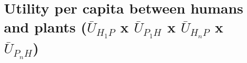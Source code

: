 \documentclass[
]{book}
\begin{document}
\newpage

\hypertarget{utility-per-capita-between-humans-and-plants-baru_h_1p-x-baru_p_1h-x-baru_h_np-x-baru_p_nh}{%
\section{\texorpdfstring{Utility per capita between humans and plants (\(\bar{U}_{H_{1}P}\) x \(\bar{U}_{P_{1}H}\) x \(\bar{U}_{H_{n}P}\) x \(\bar{U}_{P_{n}H}\))}{Utility per capita between humans and plants (\textbackslash bar\{U\}\_\{H\_\{1\}P\} x \textbackslash bar\{U\}\_\{P\_\{1\}H\} x \textbackslash bar\{U\}\_\{H\_\{n\}P\} x \textbackslash bar\{U\}\_\{P\_\{n\}H\})}}\label{utility-per-capita-between-humans-and-plants-baru_h_1p-x-baru_p_1h-x-baru_h_np-x-baru_p_nh}}

\end{document}
